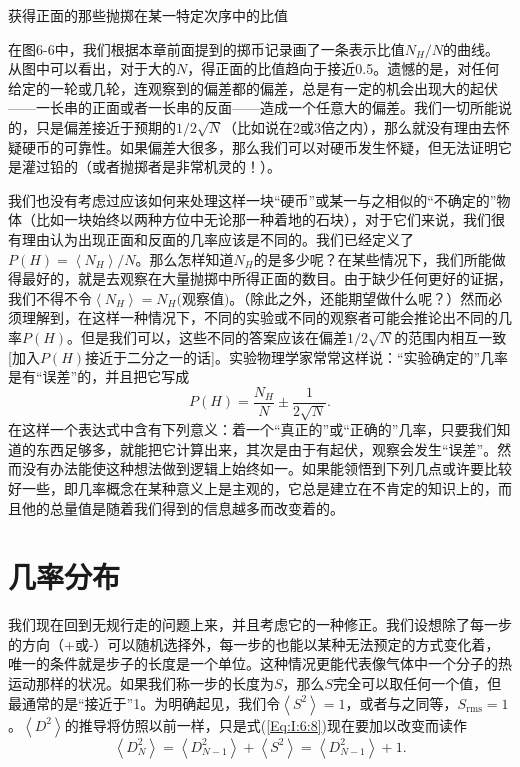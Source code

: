 \documentclass[12pt,oneside]{book}
\begin{document}
\begin{common-format}
\begin{fig}{获得正面的那些抛掷在某一特定次序中的比值}
\caption{获得正面的那些抛掷在某一特定次序中的比值}
\label{fig:获得正面的那些抛掷在某一特定次序中的比值}
\end{fig}
在图6-6中，我们根据本章前面提到的掷币记录画了一条表示比值$N_H/N$的曲线。从图中可以看出，对于大的$N$，得正面的比值趋向于接近0.5。遗憾的是，对任何给定的一轮或几轮，连观察到的偏差都的偏差，总是有一定的机会出现大的起伏——一长串的正面或者一长串的反面——造成一个任意大的偏差。我们一切所能说的，只是偏差接近于预期的$1/2\sqrt{N}$（比如说在2或3倍之内），那么就没有理由去怀疑硬币的可靠性。如果偏差大很多，那么我们可以对硬币发生怀疑，但无法证明它是灌过铅的（或者抛掷者是非常机灵的！）。

我们也没有考虑过应该如何来处理这样一块“硬币”或某一与之相似的“不确定的”物体（比如一块始终以两种方位中无论那一种着地的石块），对于它们来说，我们很有理由认为出现正面和反面的几率应该是不同的。我们已经定义了$P(H)=\left < N_H \right >/N$。那么怎样知道$N_H$的是多少呢？在某些情况下，我们所能做得最好的，就是去观察在大量抛掷中所得正面的数目。由于缺少任何更好的证据，我们不得不令$\left < N_H \right > = N_H\textrm{(观察值)}$。（除此之外，还能期望做什么呢？）然而必须理解到，在这样一种情况下，不同的实验或不同的观察者可能会推论出不同的几率$P(H)$。但是我们可以，这些不同的答案应该在偏差$1/2\sqrt{N}$的范围内相互一致[加入$P(H)$接近于二分之一的话]。实验物理学家常常这样说：“实验确定的”几率是有“误差”的，并且把它写成
\begin{equation}
\label{Eq:I:6:14}
P(H)=\frac{N_H}{N}\pm\frac{1}{2\sqrt{N}}.
\end{equation}
在这样一个表达式中含有下列意义：着一个“真正的”或“正确的”几率，只要我们知道的东西足够多，就能把它计算出来，其次是由于有起伏，观察会发生“误差”。然而没有办法能使这种想法做到逻辑上始终如一。如果能领悟到下列几点或许要比较好一些，即几率概念在某种意义上是主观的，它总是建立在不肯定的知识上的，而且他的总量值是随着我们得到的信息越多而改变着的。


\section{几率分布}
我们现在回到无规行走的问题上来，并且考虑它的一种修正。我们设想除了每一步的方向（+或-）可以随机选择外，每一步的也能以某种无法预定的方式变化着，唯一的条件就是步子的长度是一个单位。这种情况更能代表像气体中一个分子的热运动那样的状况。如果我们称一步的长度为$S$，那么$S$完全可以取任何一个值，但最通常的是“接近于”1。为明确起见，我们令$\left < S^2 \right > = 1$，或者与之同等，$S_{\text{rms}}=1$。$\left < D^2 \right > $的推导将仿照以前一样，只是式(\ref{Eq:I:6:8})现在要加以改变而读作
\begin{equation}
\label{Eq:I:6:15}
\left < D_N^2 \right >=\left <D_{N-1}^2\right >+\left <S^2\right >=\left <D_{N-1}^2\right >+1.
\end{equation}


\end{common-format}
\end{document}
